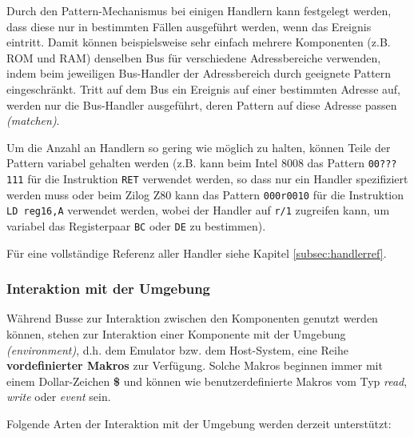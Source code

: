 \documentclass{scrartcl}
\begin{document}
\noindent Durch den Pattern-Mechanismus bei einigen Handlern kann festgelegt werden, dass diese nur in bestimmten Fällen ausgeführt werden, wenn das Ereignis eintritt. Damit können beispielsweise sehr einfach mehrere Komponenten (z.B. ROM und RAM) denselben Bus für verschiedene Adressbereiche verwenden, indem beim jeweiligen Bus-Handler der Adressbereich durch geeignete Pattern eingeschränkt. Tritt auf dem Bus ein Ereignis auf einer bestimmten Adresse auf, werden nur die Bus-Handler ausgeführt, deren Pattern auf diese Adresse passen \textit{(matchen)}.

\vspace{10pt}
\noindent Um die Anzahl an Handlern so gering wie möglich zu halten, können Teile der Pattern variabel gehalten werden (z.B. kann beim Intel 8008 das Pattern \texttt{00???111} für die Instruktion \texttt{RET} verwendet werden, so dass nur ein Handler spezifiziert werden muss oder beim Zilog Z80 kann das Pattern \texttt{000r0010} für die Instruktion \texttt{LD reg16,A} verwendet werden, wobei der Handler auf \texttt{r/1} zugreifen kann, um variabel das Registerpaar \texttt{BC} oder \texttt{DE} zu bestimmen).

\vspace{10pt}
\noindent Für eine vollständige Referenz aller Handler siehe Kapitel \ref{subsec:handlerref}.

\subsubsection{Interaktion mit der Umgebung}
\label{subsubsec:predefinedmacros}

\noindent Während Busse zur Interaktion zwischen den Komponenten genutzt werden können, stehen zur Interaktion einer Komponente mit der Umgebung \textit{(environment)}, d.h. dem Emulator bzw. dem Host-System, eine Reihe \textbf{vordefinierter Makros} zur Verfügung. Solche Makros beginnen immer mit einem Dollar-Zeichen \textbf{\$} und können wie benutzerdefinierte Makros vom Typ \textit{read}, \textit{write} oder \textit{event} sein.

\vspace{10pt}
\noindent Folgende Arten der Interaktion mit der Umgebung werden derzeit unterstützt:
\end{document}
